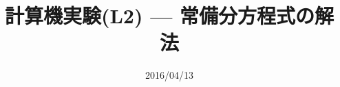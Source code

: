 \documentclass[dvipdfmx]{beamer}
\title{計算機実験(L2) --- 常備分方程式の解法}
\date{2016/04/13}
\begin{document}
\begin{frame}
  \titlepage
  \tableofcontents
\end{frame}





\end{document}
